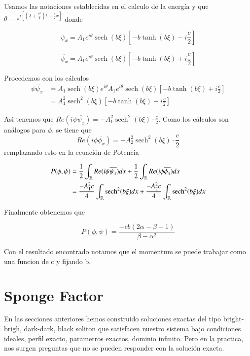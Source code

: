 \documentclass[letterpaper,11pt]{exam}
\newcommand{\R}{\mathbb R}
\newcommand{\sech}{\operatorname{sech}}
\theoremstyle{plain}
\begin{document}
Usamos las notaciones establecidas en el calculo de la energía y que $\theta=e^{i\left[(\lambda+\frac{c^2}{4})t - \frac{c}{2}x\right]}$ donde 



\begin{equation*}
    \psi_x=A_1e^{i\theta}\sech(b\xi)\left [-b\tanh(b\xi)-i\frac{c}{2} \right]
\end{equation*}

\begin{equation*}
   \overline{ \psi_x}=A_1e^{i\theta}\sech(b\xi)\left [-b\tanh(b\xi)+i\frac{c}{2} \right]
\end{equation*}

Procedemos con los cálculos 
\begin{align*}
   \psi \overline{ \psi_x}&=A_1\sech(b\xi)e^{i\theta}A_1e^{i\theta}\sech(b\xi)\left [-b\tanh(b\xi)+i\frac{c}{2} \right] \\
   &= A_1^2\sech^2(b\xi)\left [-b\tanh(b\xi)+i\frac{c}{2} \right] 
\end{align*}

Asi tenemos que $Re(i\psi \overline{ \psi_x})=-A_1^2\sech^2(b\xi)\cdot \frac{c}{2}$. Como los cálculos son análogos para $\phi$, se tiene que  $$Re(i\phi \overline{ \phi_x})=-A_2^2\sech^2(b\xi)\cdot \frac{c}{2}$$ remplazando esto en la ecuación de Potencia

\begin{align*}
    P(\phi,\psi)&=\frac{1}{2}\int_\R Re(i\psi \overline{\psi_x})dx+\frac{1}{2}\int_\R Re(i\phi \overline{\phi_x})dx \\\hspace{7mm}
    &= \frac{-A_1^2c}{4}\int_\R \sech^2(b\xi)dx +\frac{-A_2^2c}{4}\int_\R \sech^2(b\xi)dx 
\end{align*}

Finalmente obtenemos que

\begin{equation}
    P(\phi,\psi)=\frac{-cb(2\alpha-\beta-1)}{\beta-\alpha^2}
\end{equation}

Con el resultado encontrado notamos que el momentum se puede trabajar como una funcion de c y fijando b.


\section{Sponge Factor}
En las secciones anteriores hemos construido soluciones exactas del tipo bright-brigh, dark-dark, black soliton que satisfacen nuestro sistema bajo condiciones ideales, perfil exacto, parametros exactos, dominio infinito. Pero en la practica, nos surgen preguntas que no se pueden responder con la solución exacta.
\end{document}
